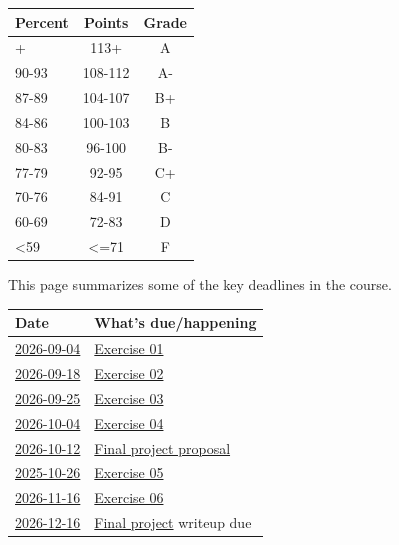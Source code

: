 \documentclass[
  letterpaper,
  DIV=11,
  numbers=noendperiod]{scrartcl}
\newcounter{none} %
\begin{document}
{\def\LTcaptype{none} %
\begin{longtable}[]{@{}lcc@{}}
\toprule\noalign{}
Percent & Points & Grade \\
\midrule\noalign{}
\endhead
\bottomrule\noalign{}
\endlastfoot
94+ & 113+ & A \\
90-93 & 108-112 & A- \\
87-89 & 104-107 & B+ \\
84-86 & 100-103 & B \\
80-83 & 96-100 & B- \\
77-79 & 92-95 & C+ \\
70-76 & 84-91 & C \\
60-69 & 72-83 & D \\
\textless59 & \textless=71 & F \\
\end{longtable}
}

This page summarizes some of the key deadlines in the course.

{\def\LTcaptype{none} %
\begin{longtable}[]{@{}
  >{\raggedright\arraybackslash}p{}
  >{\raggedright\arraybackslash}p{}@{}}
\toprule\noalign{}
\begin{minipage}[b]{\linewidth}\raggedright
Date
\end{minipage} & \begin{minipage}[b]{\linewidth}\raggedright
What's {due}/happening
\end{minipage} \\
\midrule\noalign{}
\endhead
\bottomrule\noalign{}
\endlastfoot
\href{schedule.qmd\#fri-sep-02}{2026-09-04} &
\href{exercises/ex-01-figs-in-psych-sci.qmd}{Exercise 01} \\
\href{schedule.qmd\#fri-sep-18}{2026-09-18} &
\href{exercises/ex-02-data-viz-outside-psych.qmd}{Exercise 02} \\
\href{schedule.qmd\#fri-sep-25}{2026-09-25} &
\href{exercises/ex-03-making-data.qmd}{Exercise 03} \\
\href{schedule.qmd\#fri-oct-04}{2026-10-04} &
\href{exercises/ex-04-making-figs-ggplot.qmd}{Exercise 04} \\
\href{schedule.qmd\#mon-oct-12}{2026-10-12} &
\href{exercises/final-project.qmd}{Final project proposal} \\
\href{schedule.qmd\#mon-oct-26}{2025-10-26} &
\href{exercises/ex-05-tbd.qmd}{Exercise 05} \\
\href{schedule.qmd\#mon-nov-16}{2026-11-16} &
\href{exercises/ex-06-tbd.qmd}{Exercise 06} \\
\href{schedule.qmd\#we-dec-16}{2026-12-16} &
\href{exercises/final-project.qmd}{Final project} writeup due \\
\end{longtable}
}
\end{document}

